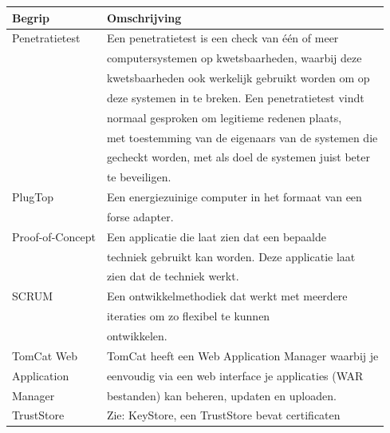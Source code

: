 \documentclass[]{article}
\begin{document}
\begin{tabular}{|| l | l ||}\hline
    Begrip           & Omschrijving                                         \\\hline\hline
    Penetratietest   & Een penetratietest is een check van \'e\'en of meer  \\
                     & computersystemen op kwetsbaarheden, waarbij deze     \\
                     & kwetsbaarheden ook werkelijk gebruikt worden om op   \\
                     & deze systemen in te breken. Een penetratietest vindt \\
                     & normaal gesproken om legitieme redenen plaats,       \\
                     & met toestemming van de eigenaars van de systemen die \\
                     & gecheckt worden, met als doel de systemen juist beter\\
                     & te beveiligen.                                       \\\hline
    PlugTop          & Een energiezuinige computer in het formaat van een   \\
                     & forse adapter.                                       \\\hline
    Proof-of-Concept & Een applicatie die laat zien dat een bepaalde        \\
                     & techniek gebruikt kan worden. Deze applicatie laat   \\
                     & zien dat de techniek werkt.                          \\\hline
    SCRUM            & Een ontwikkelmethodiek dat werkt met meerdere        \\
                     & iteraties om zo flexibel te kunnen                   \\
                     & ontwikkelen.                                         \\\hline
    TomCat Web       & TomCat heeft een Web Application Manager waarbij je  \\
    Application      & eenvoudig via een web interface je applicaties (WAR  \\
    Manager          & bestanden) kan beheren, updaten en uploaden.         \\\hline
    TrustStore       & Zie: KeyStore, een TrustStore bevat certificaten     \\

\end{tabular}
\end{document}
